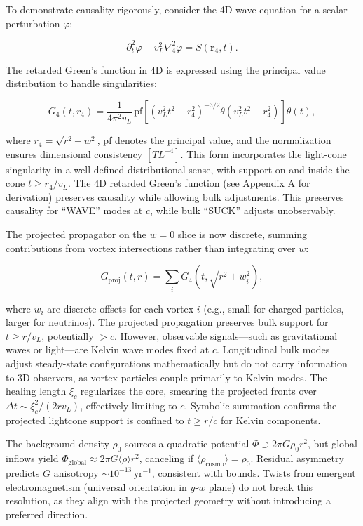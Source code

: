 To demonstrate causality rigorously, consider the 4D wave equation for a scalar perturbation $\varphi$:

\begin{equation}
\partial_t^2 \varphi - v_L^2 \nabla_4^2 \varphi = S(\mathbf{r}_4, t).
\end{equation}

The retarded Green's function in 4D is expressed using the principal value distribution to handle singularities:

\begin{equation}
G_4(t, r_4) = \frac{1}{4 \pi^2 v_L} \, \text{pf} \left[ (v_L^2 t^2 - r_4^2)^{-3/2} \theta(v_L^2 t^2 - r_4^2) \right] \theta(t),
\end{equation}

where $r_4 = \sqrt{r^2 + w^2}$, pf denotes the principal value, and the normalization ensures dimensional consistency $[T L^{-4}]$. This form incorporates the light-cone singularity in a well-defined distributional sense, with support on and inside the cone $t \geq r_4 / v_L$. The 4D retarded Green's function (see Appendix A for derivation) preserves causality while allowing bulk adjustments. This preserves causality for ``WAVE'' modes at $c$, while bulk ``SUCK'' adjusts unobservably.

The projected propagator on the $w=0$ slice is now discrete, summing contributions from vortex intersections rather than integrating over $w$:

\begin{equation}
G_{\text{proj}}(t, r) = \sum_i G_4(t, \sqrt{r^2 + w_i^2}),
\end{equation}

where $w_i$ are discrete offsets for each vortex $i$ (e.g., small for charged particles, larger for neutrinos). The projected propagation preserves bulk support for $t \geq r / v_L$, potentially $>c$. However, observable signals---such as gravitational waves or light---are Kelvin wave modes fixed at $c$. Longitudinal bulk modes adjust steady-state configurations mathematically but do not carry information to 3D observers, as vortex particles couple primarily to Kelvin modes. The healing length $\xi_c$ regularizes the core, smearing the projected fronts over $\Delta t \sim \xi_c^2 / (2 r v_L)$, effectively limiting to $c$. Symbolic summation confirms the projected lightcone support is confined to $t \geq r / c$ for Kelvin components.

The background density $\rho_0$ sources a quadratic potential $\Phi \supset 2\pi G \rho_0 r^2$, but global inflows yield $\Phi_{\text{global}} \approx 2\pi G \langle \rho \rangle r^2$, canceling if $\langle \rho_{\text{cosmo}} \rangle = \rho_0$. Residual asymmetry predicts $G$ anisotropy $\sim 10^{-13} \,\mathrm{yr}^{-1}$, consistent with bounds. Twists from emergent electromagnetism (universal orientation in $y$-$w$ plane) do not break this resolution, as they align with the projected geometry without introducing a preferred direction.

